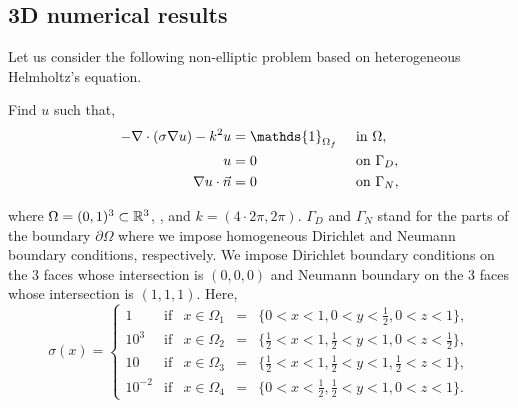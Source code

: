 \subsection{3D numerical results}
Let us consider the following non-elliptic problem based on heterogeneous Helmholtz's equation.
\begin{var_for}
  Find $u$ such that,
  \begin{alignat}{2}
    - \nabla \cdot ( \sigma \nabla u) - k^{2}u & = \mathds{1}_{\Omega_{f}} &  & \text{ in } \Omega,   \label{eq:helmholtzgoal3D} \\
    u                                          & =0                        &  & \text{ on } {\Gamma_{D}},                      \\
    \grad u\cdot \vec{n}                       & =0                        &  & \text{ on } {\Gamma_{N}},
  \end{alignat}
\end{var_for}
\noindent where  $\Omega = (0,1)^{3} \subset \mathbb{R}^{3}$, , and $k = (4 \cdot 2 \pi, 2 \pi)$. $\Gamma_{D}$ and $\Gamma_{N}$ stand for the parts of the boundary $\partial \Omega$ where we impose homogeneous Dirichlet and Neumann boundary conditions, respectively. We impose Dirichlet boundary conditions on the $3$ faces whose intersection is $(0,0,0)$ and Neumann boundary on the $3$ faces whose intersection is $(1,1,1)$.
Here,
$$\sigma(x) = \left\{ \begin{array}{ccccl}
    1       & \textrm{if} & x \in \Omega_{1} & = & \{ 0 < x < 1, 0 < y < \frac{1}{2}, 0 < z < 1 \},                     \\[1mm]
    10^{3}  & \textrm{if} & x \in \Omega_{2} & = & \{ \frac{1}{2} < x < 1, \frac{1}{2} < y < 1, 0 < z < \frac{1}{2} \}, \\[1mm]
    10      & \textrm{if} & x \in \Omega_{3} & = & \{ \frac{1}{2} < x < 1, \frac{1}{2} < y < 1, \frac{1}{2} < z < 1 \}, \\[1mm]
    10^{-2} & \textrm{if} & x \in \Omega_{4} & = & \{0 < x < \frac{1}{2}, \frac{1}{2} < y < 1, 0 < z < 1 \}.
  \end{array} \right.$$
